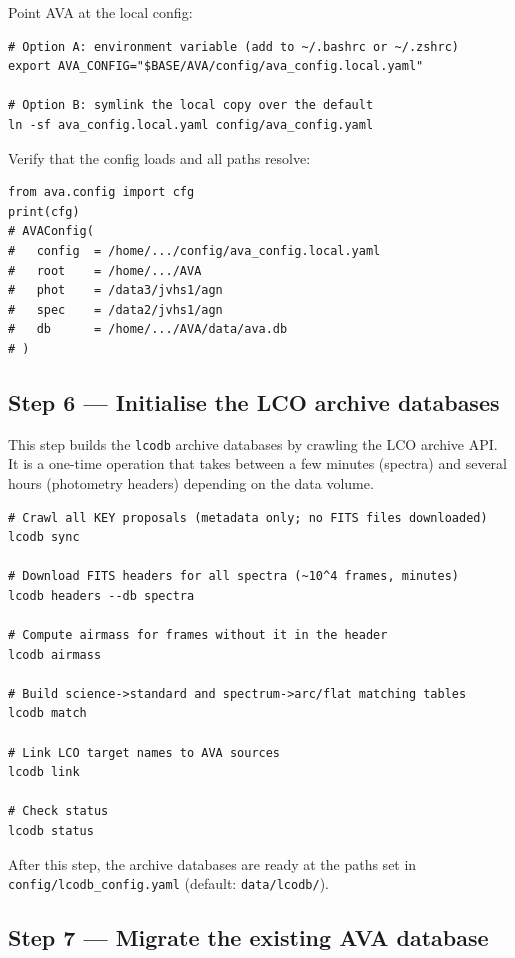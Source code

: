 \documentclass[12pt,a4paper]{article}
\begin{document}
Point AVA at the local config:
\begin{lstlisting}[style=shell]
# Option A: environment variable (add to ~/.bashrc or ~/.zshrc)
export AVA_CONFIG="$BASE/AVA/config/ava_config.local.yaml"

# Option B: symlink the local copy over the default
ln -sf ava_config.local.yaml config/ava_config.yaml
\end{lstlisting}

Verify that the config loads and all paths resolve:
\begin{lstlisting}[style=python]
from ava.config import cfg
print(cfg)
# AVAConfig(
#   config  = /home/.../config/ava_config.local.yaml
#   root    = /home/.../AVA
#   phot    = /data3/jvhs1/agn
#   spec    = /data2/jvhs1/agn
#   db      = /home/.../AVA/data/ava.db
# )
\end{lstlisting}

\subsection{Step 6 --- Initialise the LCO archive databases}

This step builds the \texttt{lcodb} archive databases by crawling the LCO
archive API.  It is a one-time operation that takes between a few minutes
(spectra) and several hours (photometry headers) depending on the data volume.

\begin{lstlisting}[style=shell]
# Crawl all KEY proposals (metadata only; no FITS files downloaded)
lcodb sync

# Download FITS headers for all spectra (~10^4 frames, minutes)
lcodb headers --db spectra

# Compute airmass for frames without it in the header
lcodb airmass

# Build science->standard and spectrum->arc/flat matching tables
lcodb match

# Link LCO target names to AVA sources
lcodb link

# Check status
lcodb status
\end{lstlisting}

After this step, the archive databases are ready at the paths set in
\texttt{config/lcodb\_config.yaml} (default: \texttt{data/lcodb/}).

\subsection{Step 7 --- Migrate the existing AVA database}
\end{document}
